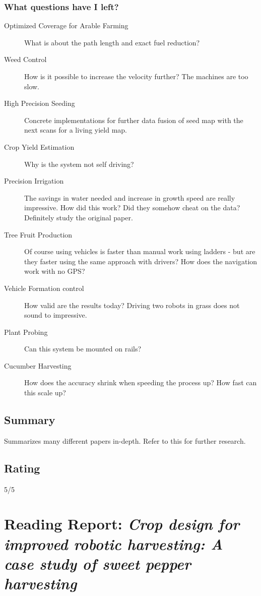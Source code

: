    \subsubsection*{What questions have I left?}
    \begin{description}
    
        \item[Optimized Coverage for Arable Farming] What is about the path length and exact fuel reduction?
        \item[Weed Control] How is it possible to increase the velocity further? The machines are too slow.
        \item[High Precision Seeding] Concrete implementations for further data fusion of seed map with the next scans for a living yield map.
        \item[Crop Yield Estimation] Why is the system not self driving?
        \item[Precision Irrigation] The savings in water needed and increase in growth speed are really impressive. How did this work? Did they somehow cheat on the data?
        Definitely study the original paper. 
        \item[Tree Fruit Production] Of course using vehicles is faster than manual work using ladders - but are they faster using the same approach with drivers? How does the navigation work with no GPS?
        \item[Vehicle Formation control] How valid are the results today? Driving two robots in grass does not sound to impressive.
        \item[Plant Probing] Can this system be mounted on rails?
        \item[Cucumber Harvesting] How does the accuracy shrink when speeding the process up? How fast can this scale up? 
    
    \end{description} 
    
    
    \subsection*{Summary} 
    Summarizes many different papers in-depth. Refer to this for further research.
    
    \subsection*{Rating}
    5/5
    
    \newpage
    \section{Reading Report: \emph{Crop design for improved robotic harvesting: A case study of sweet pepper harvesting}}
    \cite{Herck2020}
    
